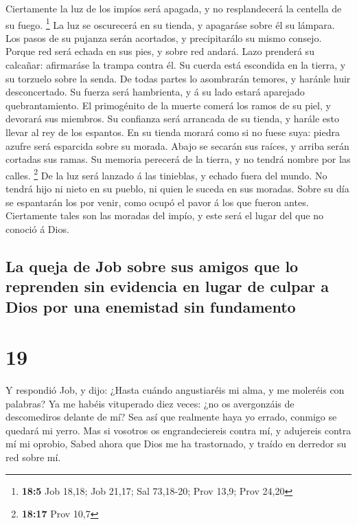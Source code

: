  Ciertamente la luz de los impíos será apagada, y no
resplandecerá la centella de su fuego. \footnote{\textbf{18:5} Job
  18,18; Job 21,17; Sal 73,18-20; Prov 13,9; Prov 24,20}  La
luz se oscurecerá en su tienda, y apagaráse sobre él su lámpara.
 Los pasos de su pujanza serán acortados, y precipitarálo su
mismo consejo.  Porque red será echada en sus pies, y sobre
red andará.  Lazo prenderá su calcañar: afirmaráse la trampa
contra él.  Su cuerda está escondida en la tierra, y su
torzuelo sobre la senda.  De todas partes lo asombrarán
temores, y haránle huir desconcertado.  Su fuerza será
hambrienta, y á su lado estará aparejado quebrantamiento. 
El primogénito de la muerte comerá los ramos de su piel, y devorará sus
miembros.  Su confianza será arrancada de su tienda, y
harále esto llevar al rey de los espantos.  En su tienda
morará como si no fuese suya: piedra azufre será esparcida sobre su
morada.  Abajo se secarán sus raíces, y arriba serán
cortadas sus ramas.  Su memoria perecerá de la tierra, y no
tendrá nombre por las calles. \footnote{\textbf{18:17} Prov 10,7}
 De la luz será lanzado á las tinieblas, y echado fuera del
mundo.  No tendrá hijo ni nieto en su pueblo, ni quien le
suceda en sus moradas.  Sobre su día se espantarán los por
venir, como ocupó el pavor á los que fueron antes. 
Ciertamente tales son las moradas del impío, y este será el lugar del
que no conoció á Dios.

\hypertarget{la-queja-de-job-sobre-sus-amigos-que-lo-reprenden-sin-evidencia-en-lugar-de-culpar-a-dios-por-una-enemistad-sin-fundamento}{%
\subsection{La queja de Job sobre sus amigos que lo reprenden sin
evidencia en lugar de culpar a Dios por una enemistad sin
fundamento}\label{la-queja-de-job-sobre-sus-amigos-que-lo-reprenden-sin-evidencia-en-lugar-de-culpar-a-dios-por-una-enemistad-sin-fundamento}}

\hypertarget{section-18}{%
\section{19}\label{section-18}}

 Y respondió Job, y dijo:  ¿Hasta cuándo
angustiaréis mi alma, y me moleréis con palabras?  Ya me
habéis vituperado diez veces: ¿no os avergonzáis de descomediros delante
de mí?  Sea así que realmente haya yo errado, conmigo se
quedará mi yerro.  Mas si vosotros os engrandeciereis contra
mí, y adujereis contra mí mi oprobio,  Sabed ahora que Dios
me ha trastornado, y traído en derredor su red sobre mí.

